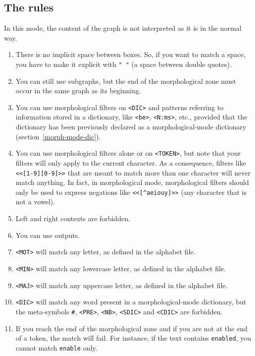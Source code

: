 \subsection{The rules}
In this mode, the content of the graph is not interpreted as it is
in the normal way.
\begin{enumerate}
  \item There is no implicit space between boxes. So, if you
want to match a space, you have to make it explicit with \verb+" "+ (a space
between double quotes).

   \item You can still use subgraphs, but the end of the morphological zone
   must occur in the same graph as its beginning.

   \item You can use morphological filters on \verb+<DIC>+ and patterns
   referring to information stored in a dictionary, like \verb+<be>+, \verb+<N:ms>+, etc., provided
   that the dictionary has been previously declared as a morphological-mode dictionary
   (section~\ref{morph-mode-dic}).
   
   \item You can use morphological filters alone or on \verb+<TOKEN>+,
   but note that your filters will only apply to the current character. As a
   consequence, filters like \verb+<<[1-9][0-9]>>+ that are meant to match more than
   one character will never match anything. In fact, in morphological mode, 
   morphological filters should only be used to express negations like 
   \verb+<<[^aeiouy]>>+ (any character that is not a vowel). 
   
   \item Left and right contexts are forbidden.

   \item You can use outputs.
   
    \item \verb+<MOT>+ will match any letter, as defined in the alphabet
    file.

    \item \verb+<MIN>+ will match any lowercase letter, as defined in the
    alphabet file.

    \item \verb+<MAJ>+ will match any uppercase letter, as defined in the
    alphabet file.

    \item \verb+<DIC>+ will match any word present in a morphological-mode
    dictionary, but the meta-symbols \verb+#+, \verb+<PRE>+, \verb+<NB>+, 
    \verb+<SDIC>+ and \verb+<CDIC>+ are forbidden.\index{\verb+#+}     

    \item If you reach the end of the morphological zone and if you are not
    at the end of a token, the match will fail. For instance, if the text
    contains \verb+enabled+, you cannot match \verb+enable+ only.
\end{enumerate}


